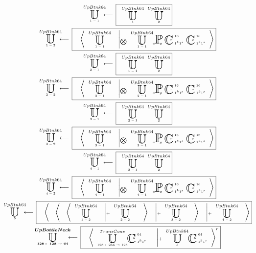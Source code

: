 \begin{equation*}
\begin{gathered}
\xunitdef{UpBtnk64}{1-1}{\quad
\xunit{UpBtnk64}{1}{} \quad
\xunit{UpBtnk64}{2}{}}
\\
\xunitdef{UpBtnk64}{1-2}{\quad
\xaggreg{\quad
\xunit{UpBtnk64}{1-1}{}
\quad \left|_{\bigotimes} \quad
\xunit{UpBtnk64}{1-1}{}
\xpool{g}{}{a}{}{}
\xconv{\ 1^k1^s}{\ 16}{}{}{r}
\xconv{\ 1^k1^s}{\ 16}{}{}{s}
\right.}}
\\
\xunitdef{UpBtnk64}{2-1}{\quad
\xunit{UpBtnk64}{1-1}{} \quad
\xunit{UpBtnk64}{2}{}}
\\
\xunitdef{UpBtnk64}{2-2}{\quad
\xaggreg{\quad
\xunit{UpBtnk64}{2-1}{}
\quad \left|_{\bigotimes} \quad
\xunit{UpBtnk64}{2-1}{}
\xpool{g}{}{a}{}{}
\xconv{\ 1^k1^s}{\ 16}{}{}{r}
\xconv{\ 1^k1^s}{\ 16}{}{}{s}
\right.}}
\\
\xunitdef{UpBtnk64}{3-1}{\quad
\xunit{UpBtnk64}{2-1}{} \quad
\xunit{UpBtnk64}{2}{}}
\\
\xunitdef{UpBtnk64}{3-2}{\quad
\xaggreg{\quad
\xunit{UpBtnk64}{3-1}{}
\quad \left|_{\bigotimes} \quad
\xunit{UpBtnk64}{3-1}{}
\xpool{g}{}{a}{}{}
\xconv{\ 1^k1^s}{\ 16}{}{}{r}
\xconv{\ 1^k1^s}{\ 16}{}{}{s}
\right.}}
\\
\xunitdef{UpBtnk64}{4-1}{\quad
\xunit{UpBtnk64}{3-1}{} \quad
\xunit{UpBtnk64}{2}{}}
\\
\xunitdef{UpBtnk64}{4-2}{\quad
\xaggreg{\quad
\xunit{UpBtnk64}{4-1}{}
\quad \left|_{\bigotimes} \quad
\xunit{UpBtnk64}{4-1}{}
\xpool{g}{}{a}{}{}
\xconv{\ 1^k1^s}{\ 16}{}{}{r}
\xconv{\ 1^k1^s}{\ 16}{}{}{s}
\right.}}
\\
\xunitdef{UpBtnk64}{5}{\quad
\xaggreg{\quad
\xaggreg{\quad
\xaggreg{\quad
\xunit{UpBtnk64}{1-2}{}
\quad \left|_+ \quad
\xunit{UpBtnk64}{2-2}{}
\right.\quad}
\quad \left|_+ \quad
\xunit{UpBtnk64}{3-2}{}
\right.\quad}
\quad \left|_+ \quad
\xunit{UpBtnk64}{4-2}{}
\right.\quad}}
\\
\xunitdef{\boldsymbol{UpBottleNeck}}{\boldsymbol{128:\ 128\rightarrow64}}{\quad
\xaggreg{\quad
\xunit{TransConv}{128:\ 256\rightarrow128}{}
\xconv{\ 1^k1^s}{\ 64}{}{}{b}
\quad \left|_+ \quad
\xunit{UpBtnk64}{5}{}
\xconv{\ 1^k1^s}{\ 64}{}{}{b}
\right.}^r}
\end{gathered}
\end{equation*}
